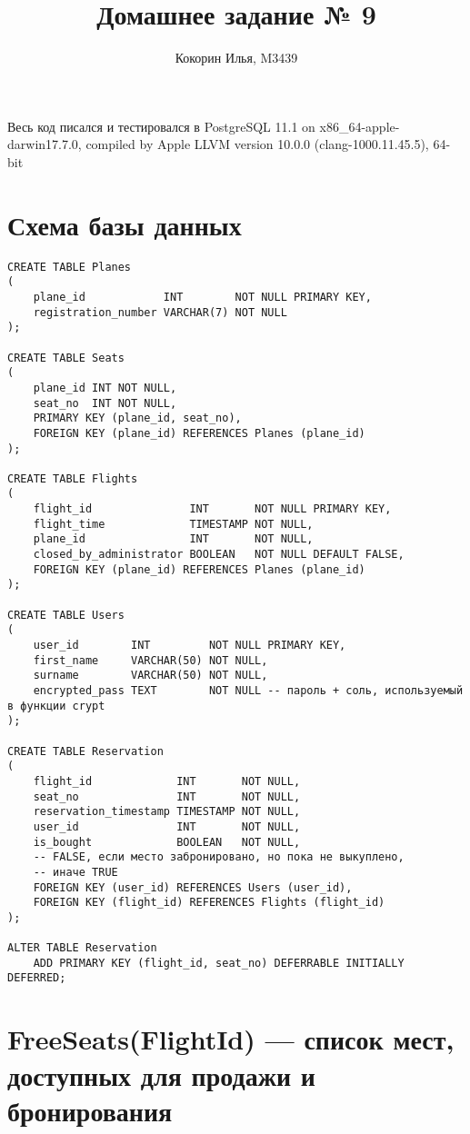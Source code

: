 \documentclass{article}
\title{Домашнее задание № 9}
\author{Кокорин Илья, M3439}
\begin{document}
	\maketitle
	
Весь код писался и тестировался в PostgreSQL 11.1 on x86\_64-apple-darwin17.7.0, compiled by Apple LLVM version 10.0.0 (clang-1000.11.45.5), 64-bit

\section{Схема базы данных}
\begin{verbatim}
CREATE TABLE Planes
(
    plane_id            INT        NOT NULL PRIMARY KEY,
    registration_number VARCHAR(7) NOT NULL
);

CREATE TABLE Seats
(
    plane_id INT NOT NULL,
    seat_no  INT NOT NULL,
    PRIMARY KEY (plane_id, seat_no),
    FOREIGN KEY (plane_id) REFERENCES Planes (plane_id)
);

CREATE TABLE Flights
(
    flight_id               INT       NOT NULL PRIMARY KEY,
    flight_time             TIMESTAMP NOT NULL,
    plane_id                INT       NOT NULL,
    closed_by_administrator BOOLEAN   NOT NULL DEFAULT FALSE,
    FOREIGN KEY (plane_id) REFERENCES Planes (plane_id)
);

CREATE TABLE Users
(
    user_id        INT         NOT NULL PRIMARY KEY,
    first_name     VARCHAR(50) NOT NULL,
    surname        VARCHAR(50) NOT NULL,
    encrypted_pass TEXT        NOT NULL -- пароль + соль, используемый в функции crypt
);

CREATE TABLE Reservation
(
    flight_id             INT       NOT NULL,
    seat_no               INT       NOT NULL,
    reservation_timestamp TIMESTAMP NOT NULL,
    user_id               INT       NOT NULL,
    is_bought             BOOLEAN   NOT NULL,
    -- FALSE, если место забронировано, но пока не выкуплено,
    -- иначе TRUE
    FOREIGN KEY (user_id) REFERENCES Users (user_id),
    FOREIGN KEY (flight_id) REFERENCES Flights (flight_id)
);

ALTER TABLE Reservation
    ADD PRIMARY KEY (flight_id, seat_no) DEFERRABLE INITIALLY DEFERRED;
\end{verbatim}

\section{FreeSeats(FlightId) — список мест, доступных для продажи и бронирования}
\end{document}
